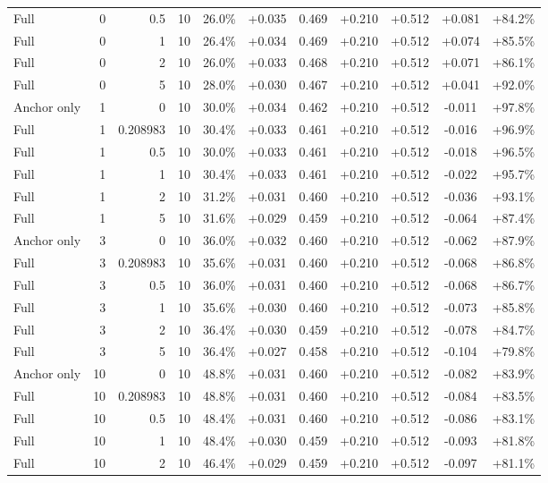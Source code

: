 \begin{table}[htbp]
\begin{tabular}{lrrrccccccc}
Full & 0 & 0.5 & 10 & 26.0\% & +0.035 & 0.469 & +0.210 & +0.512 & +0.081 & +84.2\% \\
Full & 0 & 1 & 10 & 26.4\% & +0.034 & 0.469 & +0.210 & +0.512 & +0.074 & +85.5\% \\
Full & 0 & 2 & 10 & 26.0\% & +0.033 & 0.468 & +0.210 & +0.512 & +0.071 & +86.1\% \\
Full & 0 & 5 & 10 & 28.0\% & +0.030 & 0.467 & +0.210 & +0.512 & +0.041 & +92.0\% \\
Anchor only & 1 & 0 & 10 & 30.0\% & +0.034 & 0.462 & +0.210 & +0.512 & -0.011 & +97.8\% \\
Full & 1 & 0.208983 & 10 & 30.4\% & +0.033 & 0.461 & +0.210 & +0.512 & -0.016 & +96.9\% \\
Full & 1 & 0.5 & 10 & 30.0\% & +0.033 & 0.461 & +0.210 & +0.512 & -0.018 & +96.5\% \\
Full & 1 & 1 & 10 & 30.4\% & +0.033 & 0.461 & +0.210 & +0.512 & -0.022 & +95.7\% \\
Full & 1 & 2 & 10 & 31.2\% & +0.031 & 0.460 & +0.210 & +0.512 & -0.036 & +93.1\% \\
Full & 1 & 5 & 10 & 31.6\% & +0.029 & 0.459 & +0.210 & +0.512 & -0.064 & +87.4\% \\
Anchor only & 3 & 0 & 10 & 36.0\% & +0.032 & 0.460 & +0.210 & +0.512 & -0.062 & +87.9\% \\
Full & 3 & 0.208983 & 10 & 35.6\% & +0.031 & 0.460 & +0.210 & +0.512 & -0.068 & +86.8\% \\
Full & 3 & 0.5 & 10 & 36.0\% & +0.031 & 0.460 & +0.210 & +0.512 & -0.068 & +86.7\% \\
Full & 3 & 1 & 10 & 35.6\% & +0.030 & 0.460 & +0.210 & +0.512 & -0.073 & +85.8\% \\
Full & 3 & 2 & 10 & 36.4\% & +0.030 & 0.459 & +0.210 & +0.512 & -0.078 & +84.7\% \\
Full & 3 & 5 & 10 & 36.4\% & +0.027 & 0.458 & +0.210 & +0.512 & -0.104 & +79.8\% \\
Anchor only & 10 & 0 & 10 & 48.8\% & +0.031 & 0.460 & +0.210 & +0.512 & -0.082 & +83.9\% \\
Full & 10 & 0.208983 & 10 & 48.8\% & +0.031 & 0.460 & +0.210 & +0.512 & -0.084 & +83.5\% \\
Full & 10 & 0.5 & 10 & 48.4\% & +0.031 & 0.460 & +0.210 & +0.512 & -0.086 & +83.1\% \\
Full & 10 & 1 & 10 & 48.4\% & +0.030 & 0.459 & +0.210 & +0.512 & -0.093 & +81.8\% \\
Full & 10 & 2 & 10 & 46.4\% & +0.029 & 0.459 & +0.210 & +0.512 & -0.097 & +81.1\% \\

\end{tabular}
\end{table}
